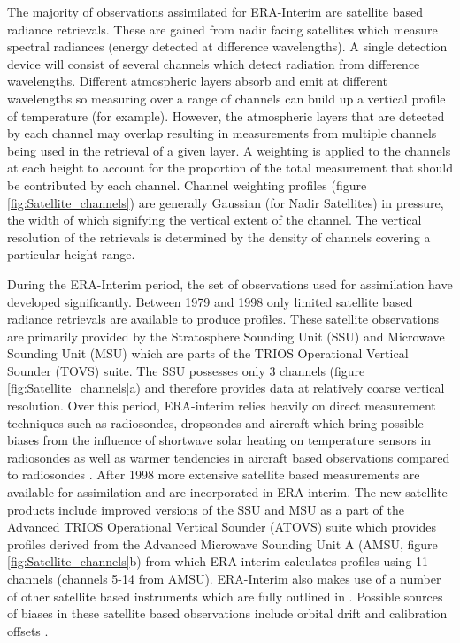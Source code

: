 The majority of observations assimilated for ERA-Interim are satellite based radiance retrievals. These are gained from nadir facing satellites which measure spectral radiances (energy detected at difference wavelengths). A single detection device will consist of several channels which detect radiation from difference wavelengths. Different atmospheric layers absorb and emit at different wavelengths so measuring over a range of channels can build up a vertical profile of temperature (for example). However, the atmospheric layers that are detected by each channel may overlap resulting in measurements from multiple channels being used in the retrieval of a given layer. A weighting is applied to the channels at each height to account for the proportion of the total measurement that should be contributed by each channel. Channel weighting profiles (figure \ref{fig:Satellite_channels}) \citep{Fujiwara17} are generally Gaussian (for Nadir Satellites) in pressure, the width of which signifying the vertical extent of the channel. The vertical resolution of the retrievals is determined by the density of channels covering a particular height range. 

During the ERA-Interim period, the set of observations used for assimilation have developed significantly. Between 1979 and 1998 only limited satellite based radiance retrievals are available to produce profiles. These satellite observations are primarily provided by the Stratosphere Sounding Unit (SSU) and Microwave Sounding Unit (MSU) which are parts of the TRIOS Operational Vertical Sounder (TOVS) suite. The SSU possesses only 3 channels (figure \ref{fig:Satellite_channels}a) and therefore provides data at relatively coarse vertical resolution. Over this period, ERA-interim relies heavily on direct measurement techniques such as radiosondes, dropsondes and aircraft \citep{Fujiwara17} which bring possible biases from the influence of shortwave solar heating on temperature sensors in radiosondes as well as warmer tendencies in aircraft based observations compared to radiosondes \citep{Ballish2008}. After 1998 more extensive satellite based measurements are available for assimilation and are incorporated in ERA-interim. The new satellite products include improved versions of the SSU and MSU as a part of the Advanced TRIOS Operational Vertical Sounder (ATOVS) suite which provides profiles derived from the Advanced Microwave Sounding Unit A (AMSU, figure \ref{fig:Satellite_channels}b) from which ERA-interim calculates profiles using 11 channels (channels 5-14 from AMSU). ERA-Interim also makes use of a number of other satellite based instruments which are fully outlined in \citep{Fujiwara17}. Possible sources of biases in these satellite based observations include orbital drift and calibration offsets \citep{Zou2006,Simmons2014}.

